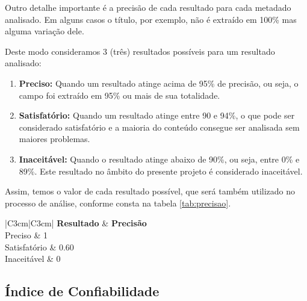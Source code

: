 \documentclass[
	12pt,               %
	openright,          %
	twoside,            %
	a4paper,            %
	english,            %
	brazil              %
	]{abntex2}
\begin{document}

Outro detalhe importante é a precisão de cada resultado para cada metadado analisado. Em alguns casos o título, por exemplo, não é extraído em 100\% mas alguma variação dele. 

Deste modo consideramos 3 (três) resultados possíveis para um resultado analisado:

\begin{enumerate}
\item \textbf{Preciso:} Quando um resultado atinge acima de 95\% de precisão, ou seja, o campo foi extraído em 95\% ou mais de sua totalidade.
\item \textbf{Satisfatório:} Quando um resultado atinge entre 90 e 94\%, o que pode ser considerado satisfatório e a maioria do conteúdo consegue ser analisada sem maiores problemas.
\item \textbf{Inaceitável:} Quando o resultado atinge abaixo de 90\%, ou seja, entre 0\% e 89\%. Este resultado no âmbito do presente projeto é considerado inaceitável.
\end{enumerate}

Assim, temos o valor de cada resultado possível, que será também utilizado no processo de análise, conforme consta na tabela \ref{tab:precisao}.


\begin{table}
    \caption{Resultados obtidos em cada metadado e sua precisão}
    \begin{center}
    	\begin{tabular}{|C{3cm}|C{3cm}|}
			\hline \textbf{Resultado} & \textbf{Precisão} \\ 
			\hline Preciso & 1\\
	    	\hline Satisfatório & 0.60 \\
	    	\hline Inaceitável & 0 \\
	    	\hline 
    	\end{tabular} 
    \end{center}
  	\label{tab:precisao}
\end{table}

\subsection{Índice de Confiabilidade}
\end{document}

